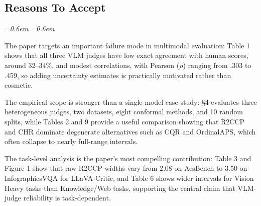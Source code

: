 \documentclass[10pt]{article}
\newenvironment{reviewerquote}{%
  \par\addvspace{0.25ex}\begingroup
  \footnotesize\itshape
  \leftskip=0.6em \rightskip=0.6em
  \color{black!78}
  \setlength{\parskip}{0.35ex plus 0.1ex}
}{%
  \endgroup\par\addvspace{0.25ex}
}
\begin{document}
\subsection*{Reasons To Accept}
\begin{reviewerquote}
The paper targets an important failure mode in multimodal evaluation: Table 1 shows that all three VLM judges have low exact agreement with human scores, around 32--34\%, and modest correlations, with Pearson ($\rho$) ranging from .303 to .459, so adding uncertainty estimates is practically motivated rather than cosmetic.

The empirical scope is stronger than a single-model case study: \S 4 evaluates three heterogeneous judges, two datasets, eight conformal methods, and 10 random splits, while Tables 2 and 9 provide a useful comparison showing that R2CCP and CHR dominate degenerate alternatives such as CQR and OrdinalAPS, which often collapse to nearly full-range intervals.

The task-level analysis is the paper's most compelling contribution: Table 3 and Figure 1 show that raw R2CCP widths vary from 2.08 on AesBench to 3.50 on InfographicsVQA for LLaVA-Critic, and Table 6 shows wider intervals for Vision-Heavy tasks than Knowledge/Web tasks, supporting the central claim that VLM-judge reliability is task-dependent.
\end{reviewerquote}
\end{document}
